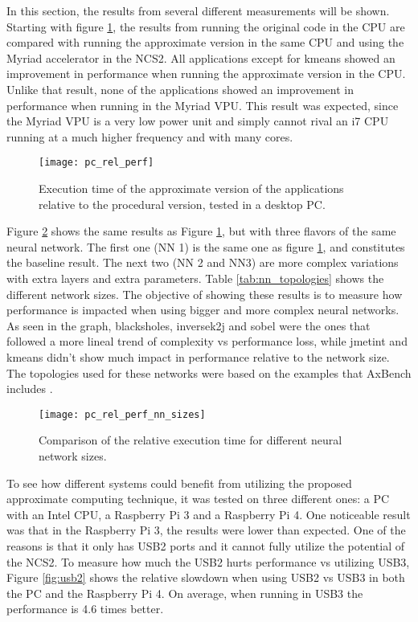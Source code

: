In this section, the results from several different measurements will be shown. Starting with figure \ref{fig:pc_rel_perf}, the results from running the original code in the CPU are compared with running the approximate version in the same CPU and using the Myriad accelerator in the NCS2. All applications except for kmeans showed an improvement in performance when running the approximate version in the CPU. Unlike that result, none of the applications showed an improvement in performance when running in the Myriad VPU. This result was expected, since the Myriad VPU is a very low power unit and simply cannot rival an i7 CPU running at a much higher frequency and with many cores.

\begin{figure}[thbp]
	\centering
	\texttt{[image: pc\_rel\_perf]}
	\caption{Execution time of the approximate version of the applications relative to the procedural version, tested in a desktop PC.}
	\label{fig:pc_rel_perf}
\end{figure}

Figure \ref{fig:pc_rel_perf_nn_sizes} shows the same results as Figure \ref{fig:pc_rel_perf}, but with three flavors of the same neural network. The first one (NN 1) is the same one as figure \ref{fig:pc_rel_perf}, and constitutes the baseline result. The next two (NN 2 and NN3) are more complex variations with extra layers and extra parameters. Table \ref{tab:nn_topologies} shows the different network sizes. The objective of showing these results is to measure how performance is impacted when using bigger and more complex neural networks. As seen in the graph, blacksholes, inversek2j and sobel were the ones that followed a more lineal trend of complexity vs performance loss, while jmetint and kmeans didn't show much impact in performance relative to the network size. The topologies used for these networks were based on the examples that AxBench includes \cite{Yazdanbakhsh2016}.

\begin{figure}[thbp]
	\centering
	\texttt{[image: pc\_rel\_perf\_nn\_sizes]}
	\caption{Comparison of the relative execution time for different neural network sizes.}
	\label{fig:pc_rel_perf_nn_sizes}
\end{figure}

To see how different systems could benefit from utilizing the proposed approximate computing technique, it was tested on three different ones: a PC with an Intel CPU, a Raspberry Pi 3 and a Raspberry Pi 4. One noticeable result was that in the Raspberry Pi 3, the results were lower than expected. One of the reasons is that it only has USB2 ports and it cannot fully utilize the potential of the NCS2. To measure how much the USB2 hurts performance vs utilizing USB3, Figure \ref{fig:usb2} shows the relative slowdown when using USB2 vs USB3 in both the PC and the Raspberry Pi 4. On average, when running in USB3 the performance is 4.6 times better.

